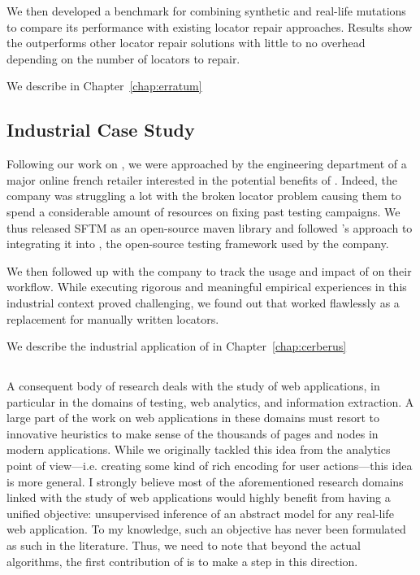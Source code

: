 We then developed a benchmark for \erratum{} combining synthetic and real-life mutations to compare its performance with existing locator repair approaches. Results show the \erratum{} outperforms other locator repair solutions with little to no overhead depending on the number of locators to repair.

We describe \erratum{} in Chapter~\ref{chap:erratum}

\subsection{\erratum{} Industrial Case Study}
Following our work on \erratum{}, we were approached by the engineering department of a major online french retailer interested in the potential benefits of \erratum{}.
Indeed, the company was struggling a lot with the broken locator problem causing them to spend a considerable amount of resources on fixing past testing campaigns.
We thus released SFTM as an open-source maven library and followed \erratum{}'s approach to integrating it into \cerberus{}, the open-source testing framework used by the company.

We then followed up with the company to track the usage and impact of \erratum{} on their workflow. 
While executing rigorous and meaningful empirical experiences in this industrial context proved challenging, we found out that \erratum{} worked flawlessly as a replacement for manually written locators.

We describe the industrial application of \erratum{} in Chapter~\ref{chap:cerberus}

\subsection{\appstract{}}
A consequent body of research deals with the study of web applications, in particular in the domains of testing, web analytics, and information extraction.
A large part of the work on web applications in these domains must resort to innovative heuristics to make sense of the thousands of pages and nodes in modern applications.
While we originally tackled this idea from the analytics point of view---i.e. creating some kind of rich encoding for user actions---this idea is more general.
I strongly believe most of the aforementioned research domains linked with the study of web applications would highly benefit from having a unified objective: unsupervised inference of an abstract model for any real-life web application. 
To my knowledge, such an objective has never been formulated as such in the literature.
Thus, we need to note that beyond the actual algorithms, the first contribution of \appstract{} is to make a step in this direction.

